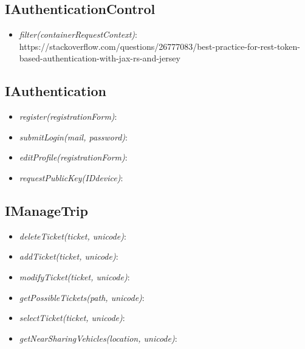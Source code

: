 \subsection{IAuthenticationControl}
\label{subsect:IAuthenticationControl}

\begin{itemize}
	\item \textit{filter(containerRequestContext)}: https://stackoverflow.com/questions/26777083/best-practice-for-rest-token-based-authentication-with-jax-rs-and-jersey
\end{itemize}

\subsection{IAuthentication}
\label{subsect:IAuthentication}

\begin{itemize}
	\item \textit{register(registrationForm)}:
	\item\textit{submitLogin(mail, password)}:
	\item\textit{editProfile(registrationForm)}:
	\item\textit{requestPublicKey(IDdevice)}:
\end{itemize}

\subsection{IManageTrip}
\label{subsect:IManageTrip}

\begin{itemize}
	\item\textit{deleteTicket(ticket, unicode)}:
	\item\textit{addTicket(ticket, unicode)}:
	\item\textit{modifyTicket(ticket, unicode)}:
	\item\textit{getPossibleTickets(path, unicode)}:
	\item\textit{selectTicket(ticket, unicode)}:
	\item\textit{getNearSharingVehicles(location, unicode)}:
\end{itemize}